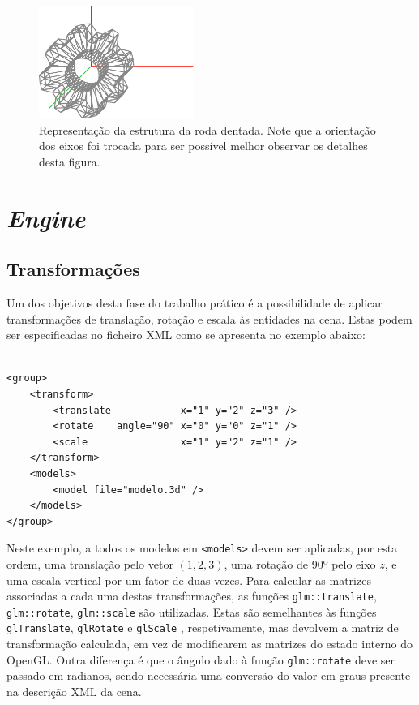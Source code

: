 \documentclass[12pt, a4paper]{article}
\begin{document}
\begin{figure}[H]
    \centering
    \includegraphics[width=0.45\textwidth]{res/phase2/figures/gear.pdf}
    \caption{
        \onehalfspacing
        Representação da estrutura da roda dentada. Note que a orientação dos eixos foi trocada para
        ser possível melhor observar os detalhes desta figura.
    }
\end{figure}

\section{\emph{Engine}}

\subsection{Transformações}

Um dos objetivos desta fase do trabalho prático é a possibilidade de aplicar transformações de
translação, rotação e escala às entidades na cena. Estas podem ser especificadas no ficheiro XML
como se apresenta no exemplo abaixo:

\lstset{language=xml}
\begin{lstlisting}

<group>
    <transform>
		<translate            x="1" y="2" z="3" />
        <rotate    angle="90" x="0" y="0" z="1" />
		<scale                x="1" y="2" z="1" />
    </transform>
    <models>
        <model file="modelo.3d" />
    </models>
</group>
\end{lstlisting}

Neste exemplo, a todos os modelos em \texttt{<models>} devem ser aplicadas, por esta ordem, uma
translação pelo vetor $(1, 2, 3)$, uma rotação de 90º pelo eixo $z$, e uma escala vertical por um
fator de duas vezes. Para calcular as matrizes associadas a cada uma destas transformações, as
funções \texttt{glm::translate}, \texttt{glm::rotate}, \texttt{glm::scale} são utilizadas.
\cite{glm-transform} Estas são semelhantes às funções \texttt{glTranslate}, \texttt{glRotate} e
\texttt{glScale} \cite{gl-transforms}, respetivamente, mas devolvem a matriz de transformação
calculada, em vez de modificarem as matrizes do estado interno do OpenGL. Outra diferença é que o
ângulo dado à função \texttt{glm::rotate} deve ser passado em radianos, sendo necessária uma
conversão do valor em graus presente na descrição XML da cena.
\end{document}

